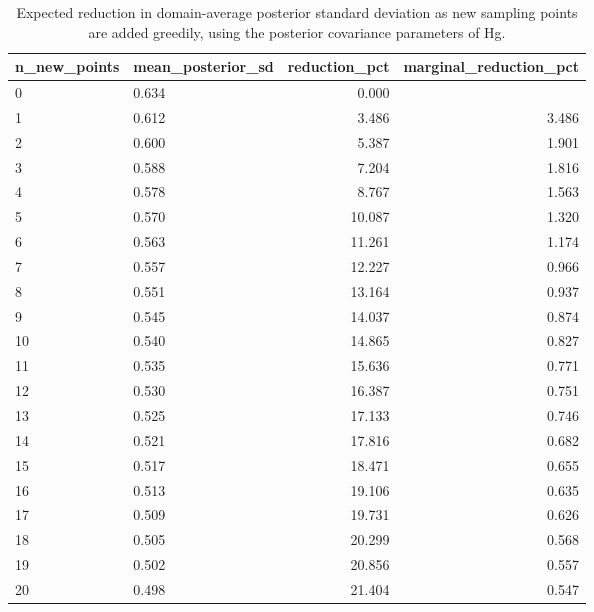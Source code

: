 \begin{table}[htbp]
\centering
\caption{Expected reduction in domain-average posterior standard deviation as new sampling points are added greedily, using the posterior covariance parameters of Hg.}
\label{tab:design}
\footnotesize
\begin{tabular}{llrr}
\toprule
n\_new\_points & mean\_posterior\_sd & reduction\_pct & marginal\_reduction\_pct \\
\midrule
0 & 0.634 & 0.000 &  \\
1 & 0.612 & 3.486 & 3.486 \\
2 & 0.600 & 5.387 & 1.901 \\
3 & 0.588 & 7.204 & 1.816 \\
4 & 0.578 & 8.767 & 1.563 \\
5 & 0.570 & 10.087 & 1.320 \\
6 & 0.563 & 11.261 & 1.174 \\
7 & 0.557 & 12.227 & 0.966 \\
8 & 0.551 & 13.164 & 0.937 \\
9 & 0.545 & 14.037 & 0.874 \\
10 & 0.540 & 14.865 & 0.827 \\
11 & 0.535 & 15.636 & 0.771 \\
12 & 0.530 & 16.387 & 0.751 \\
13 & 0.525 & 17.133 & 0.746 \\
14 & 0.521 & 17.816 & 0.682 \\
15 & 0.517 & 18.471 & 0.655 \\
16 & 0.513 & 19.106 & 0.635 \\
17 & 0.509 & 19.731 & 0.626 \\
18 & 0.505 & 20.299 & 0.568 \\
19 & 0.502 & 20.856 & 0.557 \\
20 & 0.498 & 21.404 & 0.547 \\
\bottomrule
\end{tabular}
\end{table}
